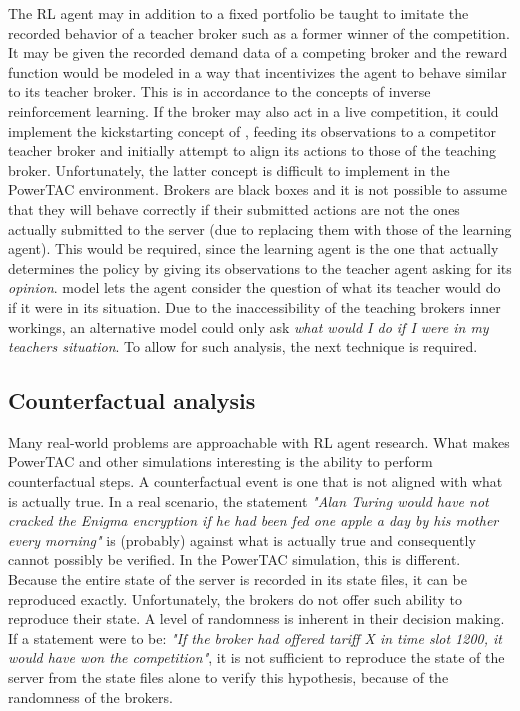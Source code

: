 The \ac{RL} agent may in addition to a fixed portfolio be taught to imitate the recorded behavior of a teacher broker
such as a former winner of the competition. It may be given the recorded demand data of a competing broker and the
reward function would be modeled in a way that incentivizes the agent to behave similar to its teacher broker. This is
in accordance to the concepts of inverse reinforcement learning. If the broker may also act in a live competition, it
could implement the kickstarting concept of \citet{schmitt2018kickstarting}, feeding its observations to a competitor
teacher broker and initially attempt to align its actions to those of the teaching broker. Unfortunately, the latter concept
is difficult to implement in the \ac{PowerTAC} environment. Brokers are black boxes and it is not possible to assume
that they will behave correctly if their submitted actions are not the ones actually submitted to the server (due to
replacing them with those of the learning agent). This would be required, since the learning agent is the one that
actually determines the policy by giving its observations to the teacher agent asking for its \emph{opinion}.
\citet{schmitt2018kickstarting} model lets the agent consider the question of what its teacher would do if it were in
its situation. Due to the inaccessibility of the teaching brokers inner workings, an alternative model could only ask
\emph{what would I do if I were in my teachers situation}. To allow for such analysis, the next technique is required.

\subsection{Counterfactual analysis}%
\label{ssub:counterfactual_analysis}

Many real-world problems are approachable with \ac{RL} agent research. What makes \ac{PowerTAC} and other simulations
interesting is the ability to perform counterfactual steps. A counterfactual event is one that is not aligned with what
is actually true. In a real scenario, the statement \emph{"Alan Turing would have not cracked the Enigma encryption if he
had been fed one apple a day by his mother every morning"} is (probably) against what is actually true and consequently cannot
possibly be verified. In the \ac{PowerTAC} simulation, this is different. Because the entire state of the server is
recorded in its state files, it can be reproduced exactly. Unfortunately, the brokers do not offer such ability to
reproduce their state. A level of randomness is inherent in their decision making. If a statement were to be: \emph{"If
the broker had offered tariff X in time slot 1200, it would have won the competition"}, it is not sufficient to reproduce the
state of the server from the state files alone to verify this hypothesis, because of the randomness of the brokers.

